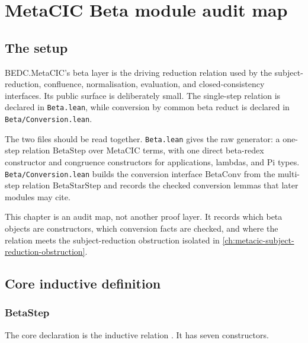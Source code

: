 \chapter{MetaCIC Beta module audit map}
\label{ch:metacic-beta-audit-map}

\section{The setup}
\label{sec:metacic-beta-audit-map-setup}

BEDC.MetaCIC's beta layer is the driving reduction relation used by the
subject-reduction, confluence, normalisation, evaluation, and closed-consistency
interfaces. Its public surface is deliberately small. The single-step relation
is declared in \texttt{Beta.lean}, while conversion by common beta reduct is
declared in \texttt{Beta/Conversion.lean}.

The two files should be read together. \texttt{Beta.lean} gives the raw
generator: a one-step relation $\mathrm{BetaStep}$ over MetaCIC terms, with
one direct beta-redex constructor and congruence constructors for applications,
lambdas, and Pi types. \texttt{Beta/Conversion.lean} builds the conversion
interface $\mathrm{BetaConv}$ from the multi-step relation
$\mathrm{BetaStarStep}$ and records the checked conversion lemmas that later
modules may cite.

This chapter is an audit map, not another proof layer. It records which beta
objects are constructors, which conversion facts are checked, and where the
relation meets the subject-reduction obstruction isolated in
\autoref{ch:metacic-subject-reduction-obstruction}.

\section{Core inductive definition}
\label{sec:metacic-beta-audit-map-core-inductive}

\subsection{BetaStep}
\label{subsec:metacic-beta-audit-map-betastep}

The core declaration is the inductive relation
. It has seven constructors.

